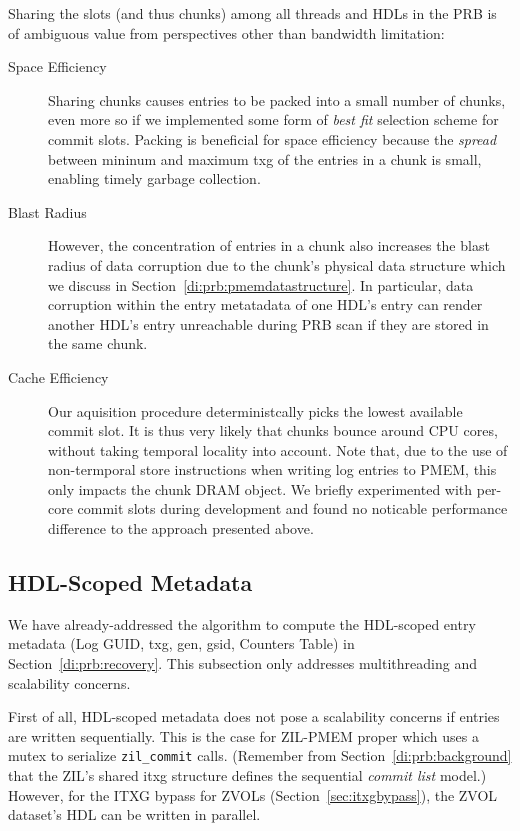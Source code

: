 \documentclass[12pt,a4paper,twoside]{book}
\begin{document}
Sharing the slots (and thus chunks) among all threads and HDLs in the PRB is of ambiguous value from perspectives other than bandwidth limitation:
\begin{description}
    \item[Space Efficiency]
        Sharing chunks causes entries to be packed into a small number of chunks, even more so if we implemented some form of \textit{best fit} selection scheme for commit slots.
        Packing is beneficial for space efficiency because the \textit{spread} between mininum and maximum txg of the entries in a chunk is small, enabling timely garbage collection.
    \item[Blast Radius]
        However, the concentration of entries in a chunk also increases the blast radius of data corruption due to the chunk's physical data structure which we discuss in Section~\ref{di:prb:pmemdatastructure}.
        In particular, data corruption within the entry metatadata of one HDL's entry can render another HDL's entry unreachable during PRB scan if they are stored in the same chunk.
    \item[Cache Efficiency] Our aquisition procedure deterministcally picks the lowest available commit slot.
        It is thus very likely that chunks bounce around CPU cores, without taking temporal locality into account.
        Note that, due to the use of non-termporal store instructions when writing log entries to PMEM, this only impacts the chunk DRAM object.
        We briefly experimented with per-core commit slots during development and found no noticable performance difference to the approach presented above.
\end{description}

\subsection{HDL-Scoped Metadata}\label{di:prb:write:hdlscoped}
We have already-addressed the algorithm to compute the HDL-scoped entry metadata (Log GUID, txg, gen, gsid, Counters Table) in Section~\ref{di:prb:recovery}.
This subsection only addresses multithreading and scalability concerns.

First of all, HDL-scoped metadata does not pose a scalability concerns if entries are written sequentially.
This is the case for ZIL-PMEM proper which uses a mutex to serialize \lstinline{zil_commit} calls.
(Remember from Section~\ref{di:prb:background} that the ZIL's shared itxg structure defines the sequential \textit{commit list} model.)
However, for the ITXG bypass for ZVOLs (Section~\ref{sec:itxgbypass}), the ZVOL dataset's HDL can be written in parallel.
\end{document}
